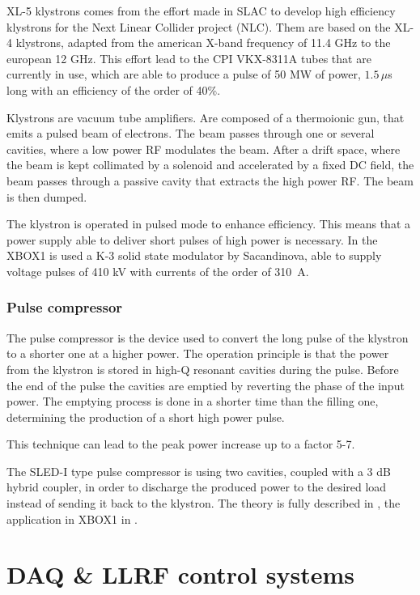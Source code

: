 XL-5 klystrons comes from the effort made in SLAC to develop high efficiency klystrons for the Next Linear Collider project (NLC). Them are based on the XL-4 klystrons, adapted from the american X-band frequency of 11.4 GHz to the european 12 GHz. This effort lead to the CPI VKX-8311A tubes that are currently in use\cite{klystron:CPI}, which are able to produce a pulse of 50 MW of power, $1.5 \, \mu$s long with an efficiency of the order of 40\%.
 
Klystrons are vacuum tube amplifiers. Are composed of a thermoionic gun, that emits a pulsed beam of electrons. The beam passes through one or several cavities, where a low power RF modulates the beam. After a drift space, where the beam is kept collimated by a solenoid and accelerated by a fixed DC field, the beam passes through a passive cavity that extracts the high power RF. The beam is then dumped. 

The klystron is operated in pulsed mode to enhance efficiency. This means that a power supply able to deliver short pulses of high power is necessary. In the XBOX1 is used a K-3 solid state modulator by Sacandinova, able to supply voltage pulses of 410 kV with currents of the order of 310~A.


\subsubsection{Pulse compressor}

The pulse compressor is the device used to convert the long pulse of the klystron to a shorter one at a higher power. The operation principle is that the power from the klystron is stored in high-Q resonant cavities during the pulse. Before the end of the pulse the cavities are emptied by reverting the phase of the input power. The emptying process is done in a shorter time than the filling one, determining the production of a short high power pulse. 

This technique can lead to the peak power increase up to a factor 5-7. 

The SLED-I type pulse compressor is using two cavities, coupled with a 3 dB hybrid coupler, in order to discharge the produced power to the desired load instead of sending it back to the klystron. The theory is fully described in \cite{Fiebig:209756}, the application in XBOX1 in \cite{SLED:ctf3}.

 


\section[DAQ \& LLRF control systems]{DAQ \& LLRF control systems}


